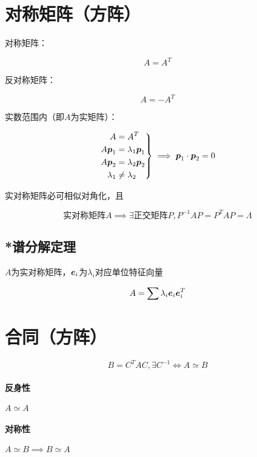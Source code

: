 \documentclass{article}
\begin{document}
\section{对称矩阵（方阵）}

\begin{definition}
    对称矩阵：

    \[A=A^T\]

    反对称矩阵：

    \[A=-A^T\]
\end{definition}

实数范围内（即$A$为实矩阵）：

\[\left.\begin{aligned}
        A         & =A^T            \\
        A\boldsymbol p_1    & =\lambda_1\boldsymbol p_1 \\
        A\boldsymbol p_2    & =\lambda_2\boldsymbol p_2 \\
        \lambda_1 & \neq\lambda_2
    \end{aligned}\right\}
    \implies \boldsymbol p_1\cdot\boldsymbol p_2=0\]

实对称矩阵必可相似对角化，且

\[\text{实对称矩阵}A\implies
    \exists\text{正交矩阵}P,P^{-1}AP=P^TAP=\Lambda\]

\subsection{*谱分解定理}

$A$为实对称矩阵，$\boldsymbol e_i$为$\lambda_i$对应单位特征向量

\[A=\sum\lambda_i\boldsymbol e_i\boldsymbol e^T_i\]

\section{合同（方阵）}

\begin{definition}
    \[B=C^TAC,\exists C^{-1}\iff A\simeq B\]
\end{definition}

\paragraph{反身性}$A\simeq A$

\paragraph{对称性}$A\simeq B\implies B\simeq A$
\end{document}
